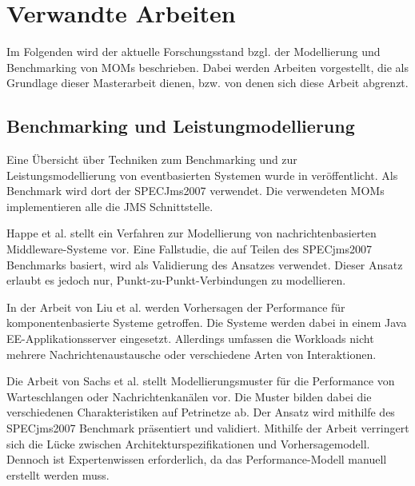 
\chapter{Verwandte Arbeiten}
\label{ch:Verwandte}
Im Folgenden wird der aktuelle Forschungsstand bzgl. der Modellierung und Benchmarking von MOMs beschrieben. Dabei werden Arbeiten vorgestellt, die als Grundlage dieser Masterarbeit dienen, bzw. von denen sich diese Arbeit abgrenzt.

\section{Benchmarking und Leistungmodellierung}
Eine Übersicht über Techniken zum Benchmarking und zur Leistungsmodellierung von eventbasierten Systemen wurde in \cite{Kounev2009} veröffentlicht. Als Benchmark wird dort der SPECJms2007 verwendet. Die verwendeten MOMs implementieren alle die JMS Schnittstelle. \par
Happe et al. \cite{happe} stellt ein Verfahren zur Modellierung von nachrichtenbasierten Middleware-Systeme vor. 
Eine Fallstudie, die auf Teilen des SPECjms2007 Benchmarks basiert, wird als Validierung des Ansatzes verwendet. Dieser Ansatz erlaubt es jedoch nur, Punkt-zu-Punkt-Verbindungen zu modellieren. \par
In der Arbeit von Liu et al. \cite{Liu2005} werden Vorhersagen der Performance für komponentenbasierte Systeme getroffen. Die Systeme werden dabei in einem Java EE-Applikationsserver eingesetzt. Allerdings umfassen die Workloads nicht mehrere Nachrichtenaustausche oder verschiedene Arten von Interaktionen. \par
Die Arbeit von Sachs et al. \cite{Sachs2013} stellt Modellierungsmuster für die Performance von Warteschlangen oder Nachrichtenkanälen vor. Die Muster bilden dabei die verschiedenen Charakteristiken auf Petrinetze ab. Der Ansatz wird mithilfe des SPECjms2007 Benchmark präsentiert und validiert. Mithilfe der Arbeit verringert sich die Lücke zwischen Architekturspezifikationen und Vorhersagemodell. Dennoch ist Expertenwissen erforderlich, da das Performance-Modell manuell erstellt werden muss. \par
